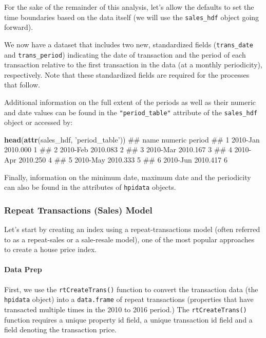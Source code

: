 \documentclass[]{article}
\newenvironment{Shaded}{\begin{snugshade}}{\end{snugshade}}
\newcommand{\KeywordTok}[1]{\textcolor[rgb]{0.13,0.29,0.53}{\textbf{#1}}}
\newcommand{\StringTok}[1]{\textcolor[rgb]{0.31,0.60,0.02}{#1}}
\newcommand{\NormalTok}[1]{#1}
\let\oldparagraph\paragraph
\renewcommand{\paragraph}[1]{\oldparagraph{#1}\mbox{}}
\begin{document}
For the sake of the remainder of this analysis, let's allow the defaults
to set the time boundaries based on the data itself (we will use the
\texttt{sales\_hdf} object going forward).

We now have a dataset that includes two new, standardized fields
(\texttt{trans\_date} and \texttt{trans\_period}) indicating the date of
transaction and the period of each transaction relative to the first
transaction in the data (at a monthly periodicity), respectively. Note
that these standardized fields are required for the processes that
follow.

Additional information on the full extent of the periods as well as
their numeric and date values can be found in the
\texttt{"period\_table"} attribute of the \texttt{sales\_hdf} object or
accessed by:

\begin{Shaded}
\begin{Highlighting}[]
  \KeywordTok{head}\NormalTok{(}\KeywordTok{attr}\NormalTok{(sales_hdf, }\StringTok{'period_table'}\NormalTok{))}
\NormalTok{##       name  numeric period}
\NormalTok{## 1 2010-Jan 2010.000      1}
\NormalTok{## 2 2010-Feb 2010.083      2}
\NormalTok{## 3 2010-Mar 2010.167      3}
\NormalTok{## 4 2010-Apr 2010.250      4}
\NormalTok{## 5 2010-May 2010.333      5}
\NormalTok{## 6 2010-Jun 2010.417      6}
\end{Highlighting}
\end{Shaded}

Finally, information on the minimum date, maximum date and the
periodicity can also be found in the attributes of \texttt{hpidata}
objects.

\subsubsection{Repeat Transactions (Sales)
Model}\label{repeat-transactions-sales-model}

Let's start by creating an index using a repeat-transactions model
(often referred to as a repeat-sales or a sale-resale model), one of the
most popular approaches to create a house price index.

\paragraph{Data Prep}\label{data-prep}

First, we use the \texttt{rtCreateTrans()} function to convert the
transaction data (the \texttt{hpidata} object) into a
\texttt{data.frame} of repeat transactions (properties that have
transacted multiple times in the 2010 to 2016 period.) The
\texttt{rtCreateTrans()} function requires a unique property id field, a
unique transaction id field and a field denoting the transaction price.
\end{document}
